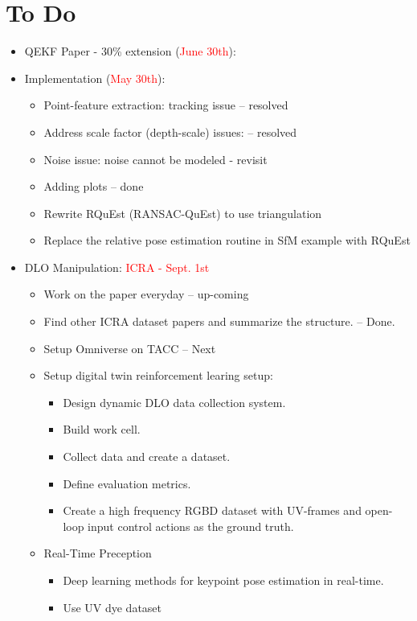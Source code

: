 \documentclass[11pt]{article}
\begin{document}
\section{To Do}
\begin{itemize}
  \item QEKF Paper - 30\% extension (\textcolor{red}{June 30th}):
  \item Implementation (\textcolor{red}{May 30th}):
  \begin{itemize}
      \item Point-feature extraction: tracking issue -- resolved
      \item Address scale factor (depth-scale) issues: -- resolved
      \item Noise issue: noise cannot be modeled - revisit
      \item Adding plots -- done
      \item Rewrite RQuEst (RANSAC-QuEst) to use triangulation
      \item Replace the relative pose estimation routine in SfM example with RQuEst
  \end{itemize}
  \item  DLO Manipulation:  \textcolor{red}{ICRA - Sept. 1st}
  \begin{itemize}
      \item Work on the paper everyday -- up-coming
      \item Find other ICRA dataset papers and summarize the structure. -- Done.
      \item Setup Omniverse on TACC -- Next
      \item Setup digital twin reinforcement learing setup:
      \begin{itemize}
        \item Design dynamic DLO data collection system.
        \item Build work cell.
        \item Collect data and create a dataset.
        \item Define evaluation metrics.
        \item Create a high frequency RGBD dataset with UV-frames and open-loop input control actions as the ground truth.
      \end{itemize}
      \item Real-Time Preception
      \begin{itemize}
        \item Deep learning methods for keypoint pose estimation in real-time.
        \item Use UV dye dataset

\end{itemize}
\end{itemize}
\end{itemize}
\end{document}
